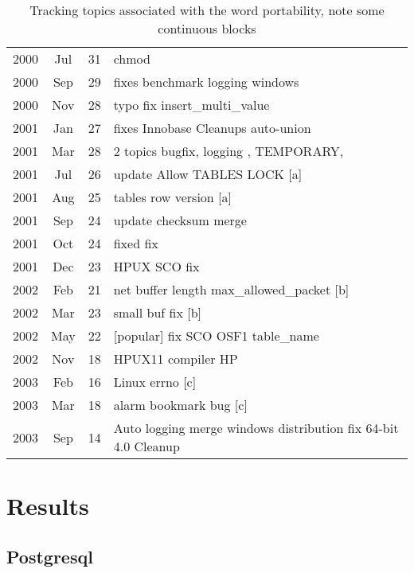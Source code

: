 \documentclass[times, 10pt,twocolumn]{article}
\begin{document}
\begin{table*}
\centering
\begin{tabular}{|ccc|l|}
\hline
2000 &  Jul &  31 &    chmod \\
2000 &  Sep &  29 &    fixes benchmark logging windows \\
2000 &  Nov &  28 &    typo fix insert\_multi\_value \\
2001 &  Jan &  27 &    fixes Innobase Cleanups auto-union \\
2001 &  Mar &  28 &    2 topics bugfix, logging , TEMPORARY,  \\
\hline
2001 &  Jul &  26 &    update Allow TABLES LOCK [a] \\ 

2001 &  Aug &  25 &    tables row version [a] \\
\hline
2001 &  Sep &  24 &    update checksum merge \\
2001 &  Oct &  24 &    fixed fix \\
2001 &  Dec &  23 &    HPUX SCO fix \\
\hline
2002 &  Feb &  21 &    net buffer length  max\_allowed\_packet [b] \\
2002 &  Mar &  23 &    small buf fix [b]  \\
\hline
2002 &  May &  22 &    [popular] fix SCO OSF1 table\_name \\
2002 &  Nov &  18 &    HPUX11 compiler HP \\
\hline
2003 &  Feb &  16 &    Linux errno  [c] \\
2003 &  Mar &  18 &    alarm bookmark bug [c] \\
\hline
2003 &  Sep &  14 &    Auto logging merge windows distribution fix 64-bit 4.0 Cleanup \\
\hline
\end{tabular}
\caption{Tracking topics associated with the word portability, note some continuous blocks}
\label{tab:portability}
\end{table*}


\section{Results}
\subsection{Postgresql}
\end{document}
